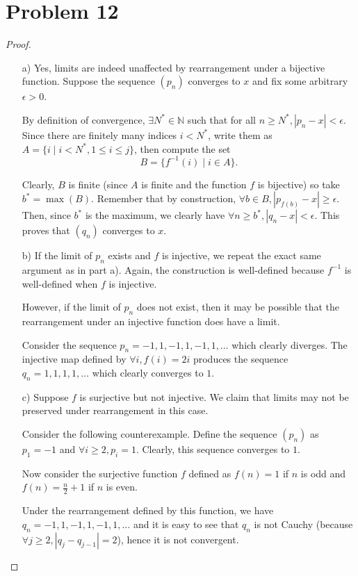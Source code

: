 \documentclass[11pt]{article}
\newcommand{\bbN}{\mathbb{N}}
\renewcommand{\_}[1]{\underline{ #1 }}
\theoremstyle{definition}
\numberwithin{equation}{subsection}
\begin{document}
\section*{Problem 12}
\begin{proof}
\begin{enumerate}
    \item[a)] Yes, limits are indeed unaffected by rearrangement under a bijective function. Suppose the sequence $(p_n)$ converges to $x$ and fix some arbitrary $\epsilon>0$.

    By definition of convergence, $\exists N^* \in \bbN$ such that for all $n\geq N^*, |p_n-x|<\epsilon$. Since there are finitely many indices $i<N^*$, write them as $A =\{i \mid i <N^*, 1\leq i\leq j\}$, then compute the set \[
    B = \{f^{-1}(i) \mid i \in A\}.
    \]

Clearly, $B$ is finite (since $A$ is finite and the function $f$ is bijective) so take $b^*=\max(B)$. Remember that by construction, $\forall b\in B, |p_{f(b)}-x|\geq \epsilon$. Then, since $b^*$ is the maximum, we clearly have $\forall n\geq b^*, |q_n-x|<\epsilon$. This proves that $(q_n)$ converges to $x$. 

\item[b)] If the limit of $p_n$ exists and $f$ is injective, we repeat the exact same argument as in part a). Again, the construction is well-defined because $f^{-1}$ is well-defined when $f$ is injective.

However, if the limit of $p_n$ does not exist, then it may be possible that the rearrangement under an injective function does have a limit.

Consider the sequence $p_n=-1,1,-1,1,-1,1,\dots$ which clearly diverges. The injective map defined by $\forall i, f(i)=2i$ produces the sequence $q_n =1,1,1,1,\dots$ which clearly converges to $1$.

\item [c)] Suppose $f$ is surjective but not injective. We claim that limits may not be preserved under rearrangement in this case. 

Consider the following counterexample. Define the sequence $(p_n)$ as $p_1=-1$ and $\forall i\geq 2, p_i=1$. Clearly, this sequence converges to $1$. 

Now consider the surjective function $f$ defined as $f(n)=1$ if $n$ is odd and $f(n) = \frac{n}{2}+1$ if $n$ is even. 

Under the rearrangement defined by this function, we have $q_n=-1,1,-1,1,-1,1,\dots$ and it is easy to see that $q_n$ is not Cauchy (because $\forall j\geq 2, |q_j-q_{j-1}|=2$), hence it is not convergent.

\end{enumerate}

\end{proof}
\end{document}
